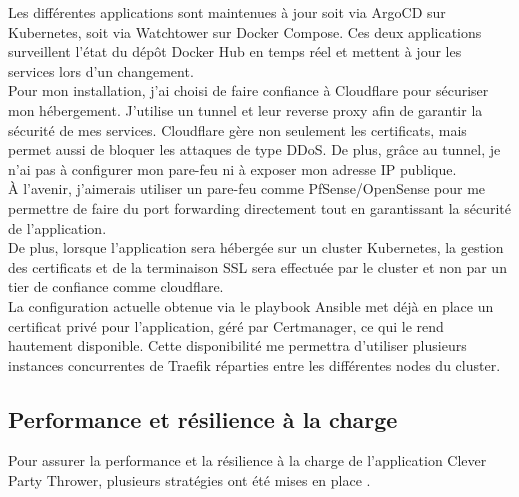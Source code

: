 Les différentes applications sont maintenues à jour soit via ArgoCD sur Kubernetes, soit via Watchtower sur Docker Compose.
Ces deux applications surveillent l'état du dépôt Docker Hub en temps réel et mettent à jour les services lors d'un changement.\\

Pour mon installation, j'ai choisi de faire confiance à Cloudflare pour sécuriser mon hébergement.
J'utilise un tunnel et leur reverse proxy afin de garantir la sécurité de mes services.
Cloudflare gère non seulement les certificats, mais permet aussi de bloquer les attaques de type DDoS. De plus, grâce au tunnel,
je n'ai pas à configurer mon pare-feu ni à exposer mon adresse IP publique.\\

À l'avenir, j'aimerais utiliser un pare-feu comme PfSense/OpenSense pour me permettre de faire du port forwarding directement
tout en garantissant la sécurité de l'application.\\

De plus, lorsque l'application sera hébergée sur un cluster Kubernetes, la gestion des certificats et de la terminaison
SSL sera effectuée par le cluster et non par un tier de confiance comme cloudflare.\\

La configuration actuelle obtenue via le playbook Ansible met déjà en place un certificat privé pour l'application, géré par Certmanager,
ce qui le rend hautement disponible.
Cette disponibilité me permettra d'utiliser plusieurs instances concurrentes de Traefik réparties entre les différentes nodes du cluster.

\subsection{Performance et résilience à la charge}\label{subsec:performance-et-resilience}

Pour assurer la performance et la résilience à la charge de l'application Clever Party Thrower, plusieurs stratégies ont été mises en place .\\

